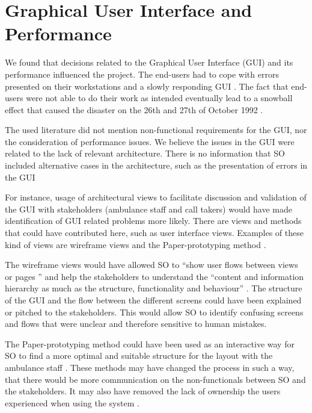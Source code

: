 \section*{Graphical User Interface and Performance}

We found that decisions related to the Graphical User Interface (GUI) and its performance influenced the project.
The end-users had to cope with errors presented on their workstations \autocite[704]{beynon1999human} and a slowly responding GUI \cite[s3126]{officialreport}.
The fact that end-users were not able to do their work as intended eventually lead to a snowball effect that caused the disaster on the 26th and 27th of October 1992 \cite[s1017w]{officialreport}.

The used literature did not mention non-functional requirements for the GUI, nor the consideration of performance issues.
We believe the issues in the GUI were related to the lack of relevant architecture.
There is no information that SO included alternative cases in the architecture, such as the presentation of errors in the GUI

For instance, usage of architectural views to facilitate discussion and validation of the GUI with stakeholders (ambulance staff and call takers) would have made identification of GUI related problems more likely.
There are views and methods that could have contributed here, such as user interface views.
Examples of these kind of views are wireframe views and the Paper-prototyping method \autocite{uxpin}\autocite{snyder2003paper}.

The wireframe views would have allowed SO to ``show user flows between views or pages \autocite[7]{uxpin}'' and help the stakeholders to understand the
``content and information hierarchy as much as the structure, functionality and behaviour'' \autocite[9]{uxpin}.
The structure of the GUI and the flow between the different screens could have been explained or pitched to the stakeholders. This would allow SO to identify confusing screens and flows that were unclear and therefore sensitive to human mistakes.

The Paper-prototyping method could have been used as an interactive way for SO to find a more optimal and suitable structure for the layout with the ambulance staff \autocite[345]{snyder2003paper}.
These methods may have changed the process in such a way, that there would be more communication on the non-functionals between SO and the stakeholders.
It may also have removed the lack of ownership the users experienced when using the system \cite[s1007o]{officialreport}.

